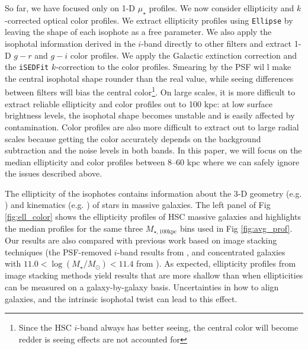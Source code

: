 \documentclass[a4paper,fleqn,usenatbib]{mnras}
\def\logms{{$\log (M_{\star}/M_{\odot})$}}
\def\mtot{{$M_{\star,100\mathrm{kpc}}$}}
\def\mden{{$\mu_{\star}$}}
\begin{document}
    So far, we have focused only on 1-D \mden{} profiles. We now consider ellipticity and $k$-corrected optical color profiles.
	We extract ellipticity profiles using \texttt{Ellipse} by leaving the shape of each isophote as a free parameter. We also apply the isophotal information derived in the $i$-band directly to other 
	filters and extract 1-D $g-r$ and $g-i$ color profiles. We apply the Galactic extinction correction and the \texttt{iSEDFit} $k$-correction  to the color profiles. Smearing by the PSF wil l make the central isophotal shape rounder than the 
	real value, while seeing differences between filters will bias the central 
	color\footnote{Since the HSC $i$-band always has better seeing, the central color 
	will become redder is seeing effects are not accounted for}. On large scales, it is more difficult to extract reliable ellipticity and 
	color profiles out to 100 kpc: at low surface brightness levels, the isophotal shape 
	becomes unstable and is easily affected by contamination. Color profiles are also more difficult to extract out to large radial scales because  getting the color accurately depends on the background subtraction and the noise levels in both bands. In this paper, we will focus on the median ellipticity and color profiles between 
	8--60 kpc where we can safely ignore the issues described above. 
	
	The ellipticity of the isophotes contains information about the 3-D geometry 
	(e.g. \citealt{Tremblay1995, Tremblay1996, Chang2013, RodriguezPadilla2013, 
	Mitsuda2017}) and kinematics (e.g. \citealt{Cappellari2012, Weijmans2014}) of 
	stars in massive galaxies.  
	The left panel of Fig \ref{fig:ell_color} shows the ellipticity profiles of HSC 
	massive galaxies and highlights the median profiles for the same three \mtot{} 
	bins used in Fig \ref{fig:avg_prof}.  Our results are also compared with previous work based on image stacking techniques (the PSF-removed $i$-band results from \citealt{Tal2011},  and
concentrated galaxies with $11.0<$\logms{}$<11.4$ from \citealt{DSouza2015}).
	As expected, ellipticity profiles from image stacking methods yield results that are more shallow than when  ellipticities can be measured on a galaxy-by-galaxy basis. Uncertainties in how to align galaxies, and the intrinsic isophotal twist can lead to this effect. 
\end{document}
